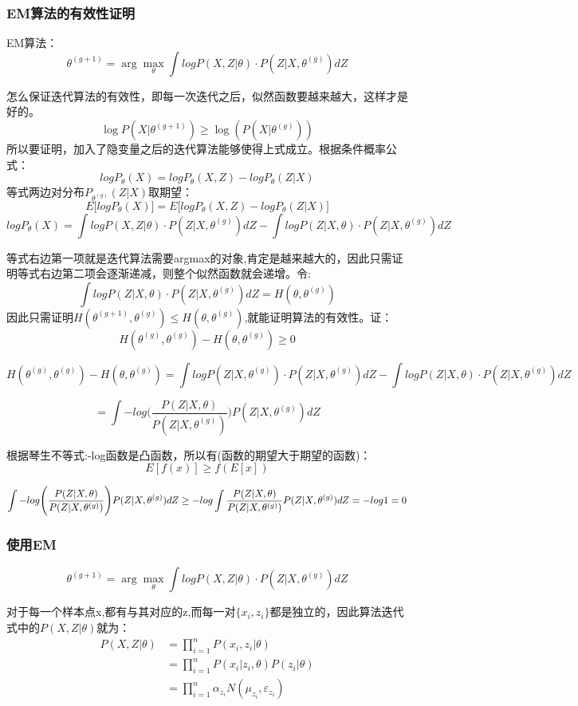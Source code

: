 \documentclass[UTF8]{ctexart} %
\begin{document}
		\subsubsection{EM算法的有效性证明}
			EM算法：
			\[\theta^{(g+1)} = \arg\max_{\theta}\int logP(X,Z|\theta)\cdot P(Z|X,\theta^{(g)})dZ\]
			
			怎么保证迭代算法的有效性，即每一次迭代之后，似然函数要越来越大，这样才是好的。
			\[\log P(X  |\theta^{(g+1)}) \geq \log(P(X|\theta^{(g)}))\]
			所以要证明，加入了隐变量之后的迭代算法能够使得上式成立。根据条件概率公式：
			\[logP_\theta(X) = logP_\theta(X,Z) - logP_\theta(Z|X)\]
			等式两边对分布$P_{\theta^{(g)}}(Z|X)$取期望：
			\[E\big[logP_\theta(X)\big] = E\big[logP_\theta(X,Z) - logP_\theta(Z|X)\big]\]
			\[logP_\theta(X) = \int logP(X,Z|\theta)\cdot P(Z|X,\theta^{(g)})dZ-
			\int logP(Z|X,\theta)\cdot P(Z|X,\theta^{(g)})dZ \]
			
			等式右边第一项就是迭代算法需要argmax的对象,肯定是越来越大的，因此只需证明等式右边第二项会逐渐递减，则整个似然函数就会递增。令:
			\[\int logP(Z|X,\theta)\cdot P(Z|X,\theta^{(g)})dZ = H(\theta, \theta^{(g)})\]
			因此只需证明$H(\theta^{(g+1)}, \theta^{(g)}) \leq  H(\theta, \theta^{(g)})$,就能证明算法的有效性。证：
			\[H(\theta^{(g)}, \theta^{(g)}) -  H(\theta, \theta^{(g)})\geq 0\]
			
			\[
			H(\theta^{(g)}, \theta^{(g)}) -  H(\theta, \theta^{(g)})=\int logP(Z|X,\theta^{(g)})\cdot P(Z|X,\theta^{(g)})dZ-\int logP(Z|X,\theta)\cdot P(Z|X,\theta^{(g)})dZ\]
			
			\[=\int-log\Bigg(\frac{P(Z|X,\theta)}{P(Z|X,\theta^{(g)})}\Bigg)P(Z|X,\theta^{(g)})dZ
			\]

			根据琴生不等式:-log函数是凸函数，所以有(函数的期望大于期望的函数)：
			\[E[f(x)]\geq f(E[x])\]
			
			\[\int-log\Bigg(\frac{P(Z|X,\theta)}{P(Z|X,\theta^{(g)})}\Bigg)P(Z|X,\theta^{(g)})dZ \\
			\geq -log\int\frac{P(Z|X,\theta)}{P(Z|X,\theta^{(g)})}P(Z|X,\theta^{(g)})dZ = -log1=0
			\]
			
			
		\subsubsection{使用EM}
			\[\theta^{(g+1)} = \arg\max_{\theta}\int logP(X,Z|\theta)\cdot P(Z|X,\theta^{(g)})dZ\]
			
			对于每一个样本点x,都有与其对应的z,而每一对$\{x_i,z_i\}$都是独立的，因此算法迭代式中的$P(X,Z|\theta)$就为：
			\[\begin{aligned}
			P(X,Z|\theta) &= \prod_{i=1}^n P(x_i,z_i|\theta) \\
			&= \prod_{i=1}^n P(x_i|z_i,\theta)P(z_i|\theta)\\
			&= \prod_{i=1}^n \alpha_{z_i} N(\mu_{z_i},\varepsilon_{z_i})
			\end{aligned}\]
			
\end{document}
